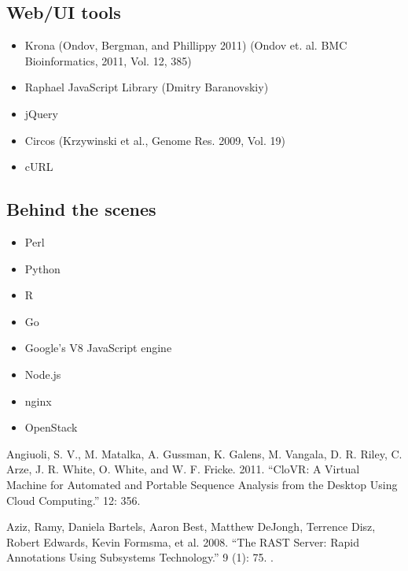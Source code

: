 \documentclass[letterpaper,10pt,english]{sphinxmanual}
\begin{document}
\subsection{Web/UI tools}
\label{\detokenize{user_manual:web-ui-tools}}\begin{itemize}
\item {} 
Krona (Ondov, Bergman, and Phillippy 2011) (Ondov et. al. BMC
Bioinformatics, 2011, Vol. 12, 385)

\item {} 
Raphael JavaScript Library (Dmitry Baranovskiy)

\item {} 
jQuery

\item {} 
Circos (Krzywinski et al., Genome Res. 2009, Vol. 19)

\item {} 
cURL

\end{itemize}


\subsection{Behind the scenes}
\label{\detokenize{user_manual:behind-the-scenes}}\begin{itemize}
\item {} 
Perl

\item {} 
Python

\item {} 
R

\item {} 
Go

\item {} 
Google’s V8 JavaScript engine

\item {} 
Node.js

\item {} 
nginx

\item {} 
OpenStack

\end{itemize}

Angiuoli, S. V., M. Matalka, A. Gussman, K. Galens, M. Vangala, D.
R. Riley, C. Arze, J. R. White, O. White, and W. F. Fricke. 2011.
“CloVR: A Virtual Machine for Automated and Portable Sequence
Analysis from the Desktop Using Cloud Computing.”  12: 356.

Aziz, Ramy, Daniela Bartels, Aaron Best, Matthew DeJongh, Terrence
Disz, Robert Edwards, Kevin Formsma, et al. 2008. “The RAST
Server: Rapid Annotations Using Subsystems Technology.”  9 (1): 75. .
\end{document}
